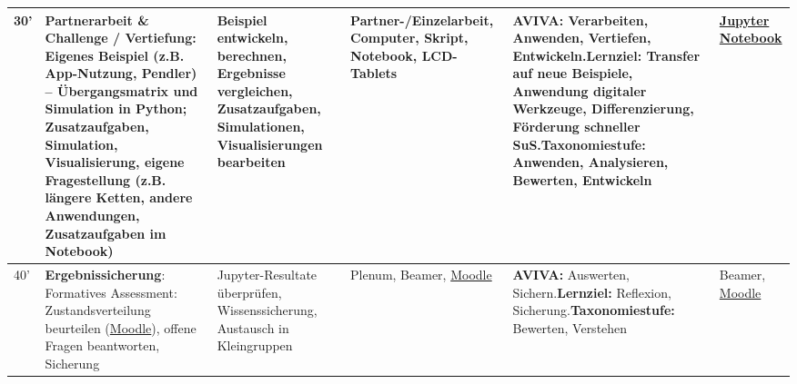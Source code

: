 \begin{landscape}
\begin{longtable}{@{}l|p{5cm}|p{5cm}|p{4cm}|p{5cm}|p{5cm}@{}}
            30' & \textbf{Partnerarbeit \& Challenge / Vertiefung}: Eigenes Beispiel (z.B. App-Nutzung, Pendler) -- Übergangsmatrix und Simulation in Python; Zusatzaufgaben, Simulation, Visualisierung, eigene Fragestellung (z.B. längere Ketten, andere Anwendungen, Zusatzaufgaben im Notebook) & Beispiel entwickeln, berechnen, Ergebnisse vergleichen, Zusatzaufgaben, Simulationen, Visualisierungen bearbeiten & Partner-/Einzelarbeit, Computer, Skript, Notebook, LCD-Tablets & \textbf{AVIVA:} Verarbeiten, Anwenden, Vertiefen, Entwickeln.\newline\textbf{Lernziel:} Transfer auf neue Beispiele, Anwendung digitaler Werkzeuge, Differenzierung, Förderung schneller SuS.\newline\textbf{Taxonomiestufe:} Anwenden, Analysieren, Bewerten, Entwickeln & \href{https://cyrilwendl.github.io/datascience-jupyter/lab/index.html}{Jupyter Notebook} \\\midrule
            40' & \textbf{Ergebnissicherung}: Formatives Assessment: Zustandsverteilung beurteilen (\href{https://moodle.kzn.ch}{Moodle}), offene Fragen beantworten, Sicherung & Jupyter-Resultate überprüfen, Wissenssicherung, Austausch in Kleingruppen & Plenum, Beamer, \href{https://moodle.kzn.ch}{Moodle} & \textbf{AVIVA:} Auswerten, Sichern.\newline\textbf{Lernziel:} Reflexion, Sicherung.\newline\textbf{Taxonomiestufe:} Bewerten, Verstehen & Beamer, \href{https://moodle.kzn.ch}{Moodle} \\
        \end{longtable}
\end{landscape}
\restoregeometry
